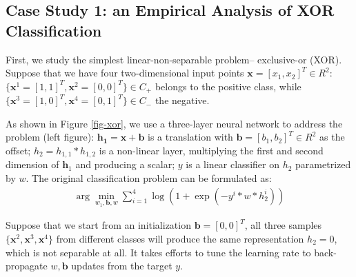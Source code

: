 


\subsection{Case Study 1: an Empirical Analysis of XOR Classification}
\label{sec:empirical}
First, we study the simplest linear-non-separable problem-- exclusive-or (XOR). Suppose that we have four two-dimensional input points $\mathbf{x}=[x_1,x_2]^T\in R^2$: $\{\mathbf{x}^1=[1,1]^T,\mathbf{x}^2=[0,0]^T\}\in C_+$ belongs to the positive class, while $\{\mathbf{x}^3=[1,0]^T,\mathbf{x}^4=[0,1]^T\}\in C_-$ the negative. 

As shown in Figure \ref{fig-xor}, we use a three-layer neural network to address the problem (left figure): $\mathbf{h_1}=\mathbf{x}+\mathbf{b}$ is a translation with  $\mathbf{b}=[b_1,b_2]^T\in R^2$ as the offset; $h_2=h_{1,1}*h_{1,2}$ is a non-linear layer, multiplying the first and second dimension of $\mathbf{h}_1$ and producing a scalar; $y$ is a linear classifier on $h_2$ parametrized by $w$. The original classification problem can be formulated as:
\begin{eqnarray*}
\arg\min_{w_1,\mathbf{b},w}\sum_{i=1}^4\log(1+\exp(-y^i*w*h^i_2))
\end{eqnarray*}

Suppose that we start from an initialization $\mathbf{b}=[0,0]^T$, all three samples $\{\mathbf{x}^2,\mathbf{x}^3,\mathbf{x}^4\}$ from different classes will produce the same representation $h_2=0$, which is not separable at all. It takes efforts to tune the learning rate to back-propagate $w,\mathbf{b}$ updates from the target $y$.

